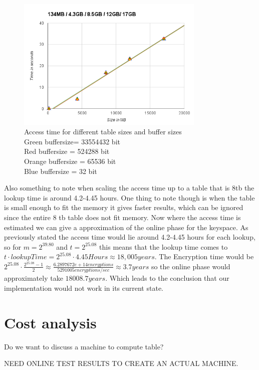 \begin{figure}[th]
  \centering
  \includegraphics[width=0.8\textwidth]{figures/AccessTime.png}
  \caption{Access time for different table sizes and buffer sizes\\
    Green buffersize= 33554432 bit\\
    Red buffersize = 524288 bit\\
    Orange buffersize = 65536 bit\\
    Blue buffersize = 32 bit\\
    }
  \label{fig:tableAccess}
\end{figure}

Also something to note when scaling the access time up to a table that is 8tb the lookup time is around 4.2-4.45 hours.
One thing to note though is when the table is small enough to fit the memory it gives faster results, which can be ignored since the entire 8 tb table does not fit memory. Now where the access time is estimated we can give a approximation of the online phase for the  keyspace. As previously stated the access time would lie around 4.2-4.45 hours for each lookup, so for $m=2^{39.80}$ and $t=2^{25.08}$ this means that the lookup time comes to $t\cdot lookupTime=2^{25.08}\cdot 4.45 Hours \approx 18,005 years$. The Encryption time would be $2^{25.08}\cdot\frac{2^{25.08}-1}{2}\approx \frac{6.2897672e+14 encryptions}{5291005 encryptions/sec} \approx 3.7 years$ so the online phase would approximately take $18008.7 years$. Which leads to the conclusion that our implementation would not work in its current state.


\section{Cost analysis}

Do we want to discuss a machine to compute table?

NEED ONLINE TEST RESULTS TO CREATE AN ACTUAL MACHINE.
